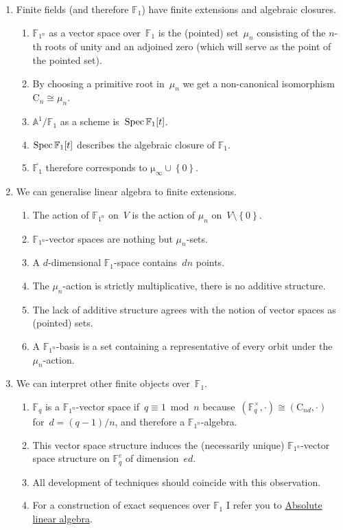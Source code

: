 \begin{enumerate}
    \item Finite fields (and therefore $\mathbb{F}_1$) have finite extensions and algebraic closures.
      \begin{enumerate}
        \item $\mathbb{F}_{1^n}$ as a vector space over~$\mathbb{F}_1$ is the (pointed) set~$\mu_n$ consisting of the $n$-th roots of unity and an adjoined zero (which will serve as the point of the pointed set).
        \item By choosing a primitive root in~$\mu_n$ we get a non-canonical isomorphism~$\mathrm{C}_n\cong\mu_n$.
        \item $\mathbb{A}^1/\mathbb{F}_1$ as a scheme is~$\operatorname{Spec}\mathbb{F}_1[t]$.
        \item $\operatorname{Spec}\mathbb{F}_1[t]$ describes the algebraic closure of $\mathbb{F}_1$.
        \item $\overline{\mathbb{F}_1}$ therefore corresponds to $\mathrm{\mu}_\infty\cup\left\{ 0 \right\}$.
      \end{enumerate}

    \item We can generalise linear algebra to finite extensions.
      \begin{enumerate}
        \item The action of $\mathbb{F}_{1^n}$ on~$V$ is the action of $\mu_n$ on~$V\setminus\left\{ 0 \right\}$.
        \item $\mathbb{F}_{1^n}$-vector spaces are nothing but $\mu_n$-sets.
        \item A $d$-dimensional $\mathbb{F}_1$-space contains~$dn$ points.
        \item The $\mu_n$-action is strictly multiplicative, there is no additive structure.
        \item The lack of additive structure agrees with the notion of vector spaces as (pointed) sets.
        \item A $\mathbb{F}_{1^n}$-basis is a set containing a representative of every orbit under the $\mu_n$-action.
      \end{enumerate}

    \item We can interpret other finite objects over~$\mathbb{F}_1$.
      \begin{enumerate}
        \item $\mathbb{F}_q$ is a $\mathbb{F}_{1^n}$-vector space if~$q\equiv 1\bmod n$ because~$(\mathbb{F}_q^\times,\cdot)\cong(\mathrm{C}_{nd},\cdot)$ for~$d=(q-1)/n$, and therefore a $\mathbb{F}_{1^n}$-algebra.
        \item This vector space structure induces the (necessarily unique) $\mathbb{F}_{1^n}$-vector space structure on $\mathbb{F}_q^e$ of dimension~$ed$.
        \item All development of techniques should coincide with this observation.
        \item For a construction of exact sequences over $\mathbb{F}_1$ I refer you to \href{http://www.neverendingbooks.org/index.php/absolute-linear-algebra.html}{Absolute linear algebra}.
      \end{enumerate}
\end{enumerate}

